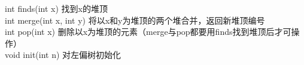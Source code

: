 int finds(int x)            找到x的堆顶\\
int merge(int x, int y)     将以x和y为堆顶的两个堆合并，返回新堆顶编号\\
int pop(int x)              删除以x为堆顶的元素（merge与pop都要用finds找到堆顶后才可操作）\\
void init(int n)            对左偏树初始化\\